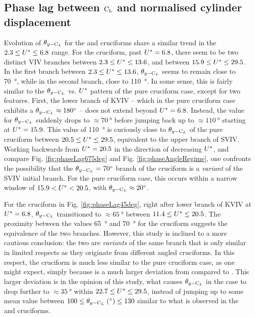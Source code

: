 \documentclass[oneside]{utmthesis}
\begin{document}
\subsection{Phase lag between $\text{C}_{\text{L}}$ and normalised cylinder displacement} \label{ssec:phaseLag67545}

Evolution of $\theta_{y-\text{C}_{L}}$ for the \angfo{} and \angth{} cruciforms share a similar trend in the $2.3 \leq U^{*} \leq 6.8$ range. For the \angfo{} cruciform, past $U^{*} = 6.8$, there seem to be two distinct VIV branches between $2.3 \leq U^{*} \leq 13.6$, and between $15.9 \leq U^{*} \leq 29.5$. In the first branch between $2.3 \leq U^{*} \leq 13.6$, $\theta_{y-\text{C}_{L}}$ seems to remain close to \SI{70}{\degree}, while in the second branch, close to \SI{110}{\degree}. In some sense, this is fairly similar to the $\theta_{y-\text{C}_{L}}$ vs. $U^{*}$ pattern of the pure cruciform case, except for two features. First, the lower branch of KVIV -- which in the pure cruciform case exhibits a $\plag \approx \SI{180}{\degree}$ -- does not extend beyond $U^{*} = 6.8$. Instead, the value for $\theta_{y-\text{C}_{L}}$ suddenly drops to $\approx \SI{70}{\degree}$ before jumping back up to $\approx \SI{110}{\degree}$ starting at $U^{*} = 15.9$. This value of \SI{110}{\degree} is curiously close to $\theta_{y-\text{C}_{L}}$ of the pure cruciform between $20.5 \leq U^{*} \leq 29.5$, equivalent to the upper branch of SVIV. Working backwards from $U^{*} = 20.5$ in the direction of decreasing $U^{*}$, and compare Fig. \ref{fig:phaseLag675deg} and Fig. \ref{fig:phaseAngleRegime}, one confronts the possibility that the $\plag = \SI{70}{\degree}$ branch of the \angfo cruciform is a \textit{variant} of the SVIV initial branch. For the pure cruciform case, this occurs within a narrow window of $15.9 < U^{*} < 20.5$, with $\plag \approx \SI{20}{\degree}$.

For the \angth{} cruciform in Fig. \ref{fig:phaseLag45deg}, right after lower branch of KVIV at $U^{*} = 6.8$, $\theta_{y-\text{C}_{L}}$ transitioned to $\approx \SI{65}{\degree}$ between $11.4 \leq U^{*} \leq 20.5$. The proximity between the values \SI{65}{\degree} and \SI{70}{\degree} for the \angfo{} cruciform suggests the equivalence of the two branches. However, this study is inclined to a more cautious conclusion: the two are \textit{variants} of the same branch that is only similar in limited respects as they originate from different angled cruciforms. In this respect, the \angth{} cruciform is much less similar to the pure cruciform case, as one might expect, simply because \angth{} is a much larger deviation from \angfi{} compared to \angfo{}. This larger deviation is in the opinion of this study, what causes $\theta_{y-\text{C}_{L}}$ in the \angth{} case to drop further to $\approx \SI{35}{\degree}$ within $22.7 \leq U^{*} \leq 29.5$, instead of jumping up to some mean value between $100 \leq \plag \; (\si{\degree}) \leq 130$ similar to what is observed in the \angfi{} and \angfo{} cruciforms.
\end{document}
